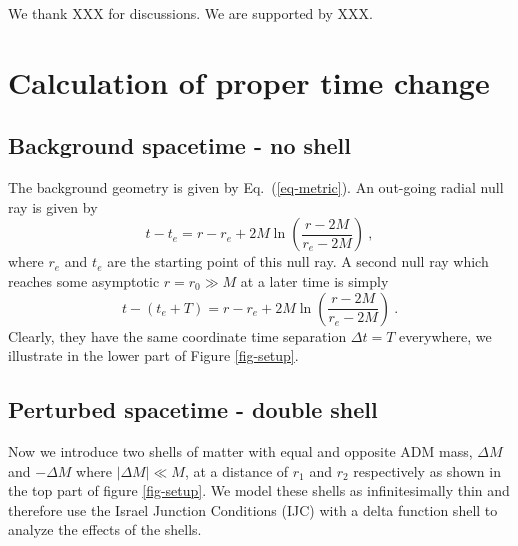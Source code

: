 \documentclass[aps,showpacs,onecolumn,floats,prd,superscriptaddress,nofootinbib]{revtex4-1}
\begin{document}
\acknowledgments

We thank XXX for discussions. We are supported by XXX.

\appendix

\section{Calculation of proper time change}
\label{Dtime}

\subsection{Background spacetime - no shell}

The background geometry is given by Eq.~(\ref{eq-metric}).
An out-going radial null ray is given by
\begin{equation}
	t - t_e = r - r_e + 2M \ln \left( \frac{r - 2M}{r_e - 2M}  \right)~,
	\label{3}
\end{equation}
where $r_e$ and $t_e$ are the starting point of this null ray.
A second null ray which reaches some asymptotic $r=r_0\gg M$ at a later time is simply
\begin{equation}
	t - (t_e + T) = r - r_e + 2M \ln \left( \frac{r - 2M}{r_e - 2M}  \right)~.
\end{equation}
Clearly, they have the same coordinate time separation $\Delta t = T$ everywhere, we illustrate in the lower part of Figure \ref{fig-setup}.

%
%

\subsection{Perturbed spacetime - double shell}

Now we introduce two shells of matter with equal and opposite ADM mass, $\Delta M$ and $-\Delta M$ where $|\Delta M| \ll M$, at a distance of $r_1$ and $r_2$ respectively as shown in the top part of figure \ref{fig-setup}. We model these shells as infinitesimally thin and therefore use the Israel Junction Conditions (IJC) \cite{Isr66} with a delta function shell to analyze the effects of the shells. 
\end{document}
